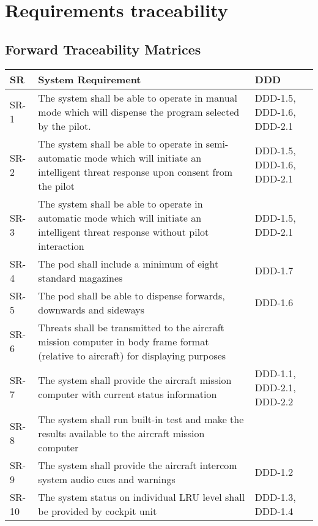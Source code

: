 \documentclass[Main]{subfiles}
\begin{document}
\chapter{Requirements traceability}


\section{Forward Traceability Matrices}


\begin{longtable}{p{} p{} p{}} \hline
SR & System Requirement & DDD \\\hline

SR-1 & The system shall be able to operate in manual mode which will dispense the program selected by the pilot. & DDD-1.5, DDD-1.6, DDD-2.1 \\

SR-2 & The system shall be able to operate in semi-automatic mode which will initiate an intelligent threat response upon consent from the pilot & DDD-1.5, DDD-1.6, DDD-2.1 \\

SR-3 & The system shall be able to operate in automatic mode which will initiate an intelligent threat response without pilot interaction & DDD-1.5, DDD-2.1 \\

SR-4 & The pod shall include a minimum of eight standard magazines & DDD-1.7 \\

SR-5 & The pod shall be able to dispense forwards, downwards and sideways & DDD-1.6 \\

SR-6 & Threats shall be transmitted to the aircraft mission computer in body frame format (relative to aircraft) for displaying purposes &  \\

SR-7 & The system shall provide the aircraft mission computer with current status information & DDD-1.1, DDD-2.1, DDD-2.2 \\

SR-8 &  The system shall run built-in test and make the results available to the aircraft mission computer &  \\

SR-9 & The system shall provide the aircraft intercom system audio cues and warnings & DDD-1.2 \\

SR-10 &  The system status on individual LRU level shall be provided by cockpit unit & DDD-1.3, DDD-1.4 \\


\end{longtable}
\end{document}
